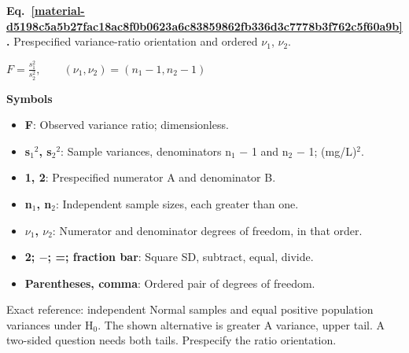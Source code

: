 \documentclass[11pt,a4paper]{article}
\begin{document}
\par\medskip
\noindent\begin{minipage}{\linewidth}
\label{material-d5198c5a5b27fac18ac8f0b0623a6c83859862fb336d3c7778b3f762c5f60a9b}
\noindent\textbf{Eq.~\ref*{material-d5198c5a5b27fac18ac8f0b0623a6c83859862fb336d3c7778b3f762c5f60a9b}.} Prespecified variance-ratio orientation and ordered \ensuremath{\nu}\ensuremath{{}_1}, \ensuremath{\nu}\ensuremath{{}_2}.\par\nopagebreak
\begin{center}\begin{adjustbox}{max width=\linewidth}$\displaystyle F=\frac{s_1^2}{s_2^2},\qquad (\nu_1,\nu_2)=(n_1-1,n_2-1)$\end{adjustbox}\end{center}

\par\noindent\textbf{Symbols}

\begin{itemize}\setlength{\itemsep}{1pt}\setlength{\parsep}{0pt}
\item \textbf{F}: Observed variance ratio; dimensionless.
\item \textbf{s\ensuremath{{}_1}\ensuremath{{}^2}, s\ensuremath{{}_2}\ensuremath{{}^2}}: Sample variances, denominators n\ensuremath{{}_1} \ensuremath{-} 1 and n\ensuremath{{}_2} \ensuremath{-} 1; (mg/L)\ensuremath{{}^2}.
\item \textbf{1, 2}: Prespecified numerator A and denominator B.
\item \textbf{n\ensuremath{{}_1}, n\ensuremath{{}_2}}: Independent sample sizes, each greater than one.
\item \textbf{\ensuremath{\nu}\ensuremath{{}_1}, \ensuremath{\nu}\ensuremath{{}_2}}: Numerator and denominator degrees of freedom, in that order.
\item \textbf{2; \ensuremath{-}; =; fraction bar}: Square SD, subtract, equal, divide.
\item \textbf{Parentheses, comma}: Ordered pair of degrees of freedom.
\end{itemize}

Exact reference: independent Normal samples and equal positive population variances under H\ensuremath{{}_0}. The shown alternative is greater A variance, upper tail. A two-sided question needs both tails. Prespecify the ratio orientation.

\end{minipage}\par
\medskip
\end{document}
